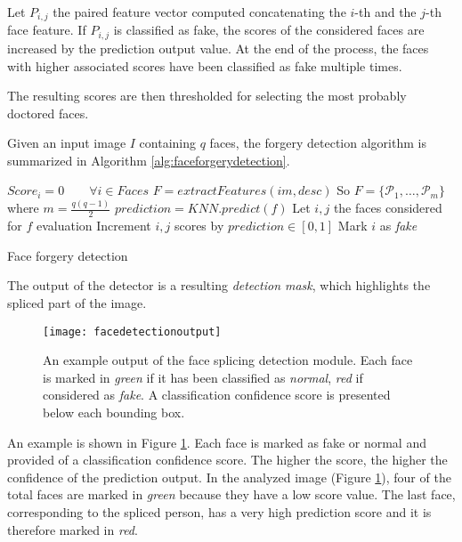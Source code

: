 Let $P_{i, j}$ the paired feature vector computed concatenating the $i$-th and the $j$-th face feature. If $P_{i, j}$ is classified as fake, the scores of the considered faces are increased by the prediction output value. At the end of the process, the faces with higher associated scores have been classified as fake multiple times.

The resulting scores are then thresholded for selecting the most probably doctored faces. 

Given an input image $I$ containing $q$ faces, the forgery detection algorithm is summarized in Algorithm \ref{alg:faceforgerydetection}.

\begin{algorithm}[!h]
\begin{algorithmic}[1]
\State $Score_i = 0 \qquad \forall i \in Faces$ 
\State $F = extractFeatures(im, desc)$
\State So $F = \{\mathcal{P}_1, \ldots, \mathcal{P}_m\} $ where $ m = \frac{q(q-1)}{2}$
\State $prediction = KNN.predict(f)$
\State Let $i, j$ the faces considered for $f$ evaluation
\State Increment $i, j$ scores by $prediction \in [0, 1]$
\EndFor
\EndFor
\EndFor
{}
\State Mark $i$ as \emph{fake}
\EndIf
\EndFor
\end{algorithmic}\caption{Face forgery detection}\label{alg:faceforgerydetection}
\end{algorithm}

The output of the detector is a resulting \emph{detection mask}, which highlights the spliced part of the image.

\begin{figure}[h!]
  \centering
    \texttt{[image: facedetectionoutput]}
    \caption{An example output of the face splicing detection module. Each face is marked in \emph{green} if it has been classified as \emph{normal}, \emph{red} if considered as \emph{fake}. A classification confidence score is presented below each bounding box.}
    \label{fig:facesplicingdetectionoutput}
\end{figure}

An example is shown in Figure \ref{fig:facesplicingdetectionoutput}. Each face is marked as fake or normal and provided of a classification confidence score. The higher the score, the higher the confidence of the prediction output. In the analyzed image (Figure \ref{fig:facesplicingdetectionoutput}), four of the total faces are marked in \emph{green} because they have a low score value. The last face, corresponding to the spliced person, has a very high prediction score and it is therefore marked in \emph{red}.


